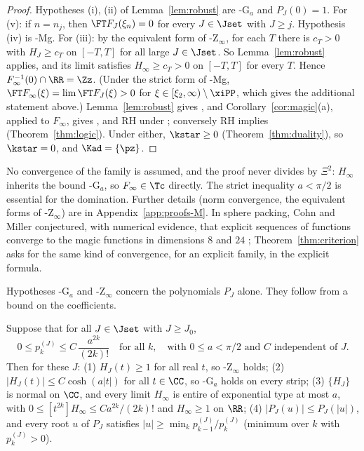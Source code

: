 \begin{proof}
Hypotheses (i), (ii) of Lemma~\ref{lem:robust} are \hyp{G$_a$} and $P_J(0)=1$. For (v): if $n=n_j$, then
$\FT F_J(\xi_n)=0$ for every $J\in\Jset$ with $J\ge j$. Hypothesis (iv) is \hyp{Mg}. For (iii): by the equivalent form of
\hyp{Z$_\infty$}, for each $T$ there is $c_T>0$ with $H_J\ge c_T$ on $[-T,T]$ for all large $J\in\Jset$. So Lemma~\ref{lem:robust} applies,
and its limit satisfies $H_\infty\ge c_T>0$ on $[-T,T]$ for every $T$. Hence $F_\infty^{-1}(0)\cap\RR=\Zz$. (Under the strict form of
\hyp{Mg}, $\FT F_\infty(\xi)=\lim\FT F_J(\xi)>0$ for $\xi\in[\xi_2,\infty)\setminus\xiPP$, which gives the additional statement above.)
Lemma~\ref{lem:robust} gives \condS, and Corollary~\ref{cor:magic}(a), applied to $F_\infty$, gives \condU, and RH under \condE; conversely RH
implies \condE{} (Theorem~\ref{thm:logic}). Under either, $\kstar\ge0$ (Theorem~\ref{thm:duality}), so
$\kstar=0$, and $\Kad=\{\pz\}$.
\end{proof}

No convergence of the family is assumed, and the proof never divides by $\Xi^2$: $H_\infty$ inherits the bound
\hyp{G$_a$}, so $F_\infty\in\Tc$ directly. The strict inequality $a<\pi/2$ is essential for the domination. Further
details (norm convergence, the equivalent forms of \hyp{Z$_\infty$}) are in Appendix~\ref{app:proofs-M}. In sphere packing, Cohn and Miller
conjectured, with numerical evidence, that explicit sequences of functions converge to the magic functions in dimensions $8$ and $24$
\cite{CM16}; Theorem~\ref{thm:criterion} asks for the same kind of convergence, for an explicit family, in the explicit formula.

Hypotheses \hyp{G$_a$} and \hyp{Z$_\infty$} concern the polynomials $P_J$ alone. They follow from a bound on the coefficients.

\begin{proposition}\label{prop:coeff}
Suppose that for all $J\in\Jset$ with $J\ge J_0$,
\begin{equation}\label{eq:POSa}
0\le p_k^{(J)}\le C\,\frac{a^{2k}}{(2k)!}\quad\text{for all }k,\quad\text{with }0\le a<\pi/2\text{ and }C\text{ independent of }J.
\end{equation}
Then for these $J$: (1) $H_J(t)\ge1$ for all real $t$, so \hyp{Z$_\infty$} holds; (2) $\lvert H_J(t)\rvert\le C\cosh(a\lvert t\rvert)$ for all $t\in\CC$, so \hyp{G$_a$} holds on every strip;
(3) $\{H_J\}$ is normal on $\CC$, and every limit $H_\infty$ is entire of exponential type at most $a$, with
$0\le[t^{2k}]H_\infty\le Ca^{2k}/(2k)!$ and $H_\infty\ge1$ on $\RR$; (4) $\lvert P_J(u)\rvert\le P_J(\lvert u\rvert)$, and every root $u$ of
$P_J$ satisfies $\lvert u\rvert\ge\min_kp_{k-1}^{(J)}/p_k^{(J)}$ (minimum over $k$ with $p_k^{(J)}>0$).
\end{proposition}

